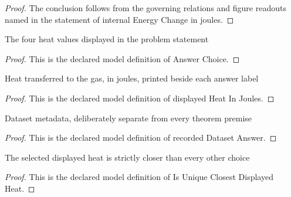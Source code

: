 \begin{proof}
  The conclusion follows from the governing relations and figure readouts named in the statement of internal Energy Change in joules.
\end{proof}
\begin{definition}
  \label{def:physics:phyx-mini-0413:phyxminiproblems-problemphyxmini0413-answerchoice}
  The four heat values displayed in the problem statement
\end{definition}
\begin{proof}
  This is the declared model definition of Answer Choice.
\end{proof}
\begin{definition}
  \label{def:physics:phyx-mini-0413:phyxminiproblems-problemphyxmini0413-displayedheatinjoules}
  Heat transferred to the gas, in joules, printed beside each answer label
\end{definition}
\begin{proof}
  This is the declared model definition of displayed Heat In Joules.
\end{proof}
\begin{definition}
  \label{def:physics:phyx-mini-0413:phyxminiproblems-problemphyxmini0413-recordeddatasetanswer}
  Dataset metadata, deliberately separate from every theorem premise
\end{definition}
\begin{proof}
  This is the declared model definition of recorded Dataset Answer.
\end{proof}
\begin{definition}
  \label{def:physics:phyx-mini-0413:phyxminiproblems-problemphyxmini0413-isuniqueclosestdisplayedheat}
  The selected displayed heat is strictly closer than every other choice
\end{definition}
\begin{proof}
  This is the declared model definition of Is Unique Closest Displayed Heat.
\end{proof}
